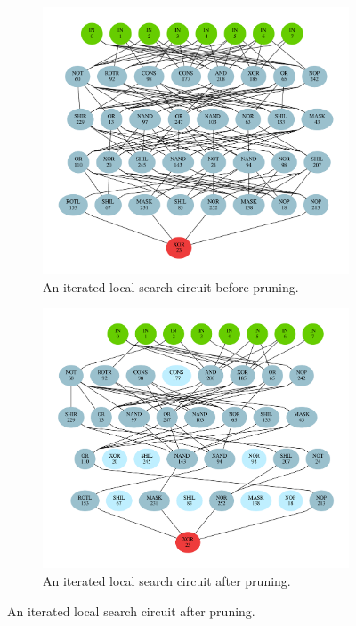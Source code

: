 \documentclass[
    digital,    %
    oneside,    %
    color,
    11pt,
    nocover,
    notable,
    nolof,
    nolot,
]{fithesis3}
\begin{document}
\begin{figure}
\begin{nomar}
\centering
\begin{subfigure}{.65\textwidth}
  \centering
  \includegraphics[width=\textwidth]{./graphics/ils/circuit}
  \caption{An iterated local search circuit before pruning.}
  \label{fig:ils-circuit-unpruned}
\end{subfigure}%
\begin{subfigure}{.65\textwidth}
  \centering
  \includegraphics[width=\textwidth]{./graphics/ils/pruned}
  \caption{An iterated local search circuit after pruning.}
  \label{fig:ils-circuit-pruned}
\end{subfigure}


\end{nomar}
\end{figure}
\end{document}
